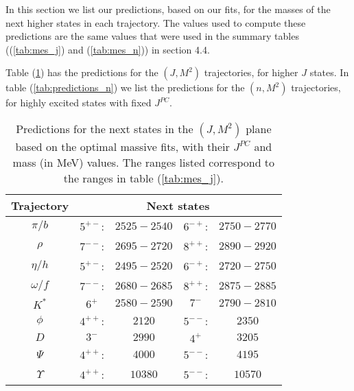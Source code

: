 \documentclass[11pt,a4]{article}
\begin{document}
	In this section we list our predictions, based on our fits, for the masses of the next higher states in each trajectory. The values used to compute these predictions are the same values that were used in the summary tables ((\ref{tab:mes_j}) and (\ref{tab:mes_n})) in section 4.4.

	Table (\ref{tab:predictions}) has the predictions for the \((J,M^2)\) trajectories, for higher \(J\) states. In table (\ref{tab:predictions_n}) we list the predictions for the \((n,M^2)\) trajectories, for highly excited states with fixed \(J^{PC}\).
	
	\begin{table}[tpb] \centering
					\begin{tabular}{|c|cc|cc|} \hline
						
						Trajectory & \multicolumn{4}{|c|}{Next states} \\ \hline
						
						\(\pi/b\) & \(5^{+-}\): & \(2525-2540\) & \(6^{-+}\): & \(2750-2770\) \\
						
						\(\rho\) & \(7^{--}\): & \(2695-2720\) & \(8^{++}\): & \(2890-2920\) \\
						
						\(\eta/h\) & \(5^{+-}\): & \(2495-2520\) & \(6^{-+}\): & \(2720-2750\) \\
						
						\(\omega/f\) & \(7^{--}\): & \(2680-2685\) & \(8^{++}\): & \(2875-2885\) \\
						
						\(K^*\) & \(6^+\) & \(2580-2590\) & \(7^-\) & \(2790-2810\) \\
						
						\(\phi\) & \(4^{++}\): & \(2120\) & \(5^{--}\): & \(2350\) \\
						
						\(D\) & \(3^-\) & \(2990\) & \(4^+\) & \(3205\) \\
						
						\(\Psi\) & \(4^{++}\): & \(4000\) & \(5^{--}\): & \(4195\) \\
						
						\(\Upsilon\) & \(4^{++}\): & \(10380\) & \(5^{--}\): & \(10570\) \\
						
					\hline \end{tabular}
					\caption{\label{tab:predictions} Predictions for the next states in the \((J,M^2)\) plane based on the optimal massive fits, with their \(J^{PC}\) and mass (in MeV) values. The ranges listed correspond to the ranges in table (\ref{tab:mes_j}).}

					\end{table}
					
\end{document}
